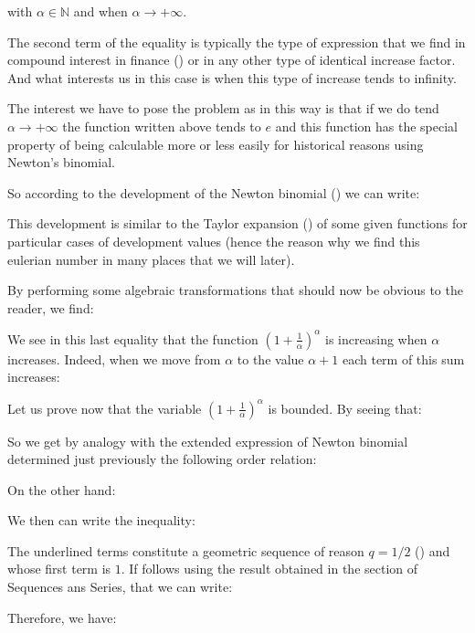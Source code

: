 	with $\alpha \in \mathbb{N}$ and when $\alpha \rightarrow +\infty$.
	\begin{tcolorbox}[title=Remark,colframe=black,arc=10pt]
	The second term of the equality is typically the type of expression that we find in compound interest in finance () or in any other type of identical increase factor. And what interests us in this case is when this type of increase tends to infinity.
	\end{tcolorbox}
	The interest we have to pose the problem as in this way is that if we do tend $\alpha \rightarrow +\infty$ the function written above tends to $e$ and this function has the special property of being calculable more or less easily for historical reasons using Newton's binomial.
	
	So according to the development of the Newton binomial () we can write:
	
	This development is similar to the Taylor expansion () of some given functions for particular cases of development values (hence the reason why we find this eulerian number in many places that we will later).
	
	By performing some algebraic transformations that should now be obvious to the reader, we find:
	
	We see in this last equality that the function $\left(1+\frac{1}{\alpha}\right)^\alpha$ is increasing when $\alpha$ increases. Indeed, when we move from $\alpha$ to the value $\alpha+1$ each term of this sum increases:
	
	Let us prove now that the variable $\left(1+\frac{1}{\alpha}\right)^\alpha$ is bounded. By seeing that:
	
	So we get by analogy with the extended expression of Newton binomial determined just previously the following order relation:
	
	On the other hand:
	
	We then can write the inequality:
	
	The underlined terms constitute a geometric sequence of reason $q=1/2$ () and whose first term is $1$. If follows using the result obtained in the section of Sequences ans Series, that we can write:
	
	Therefore, we have:
	
